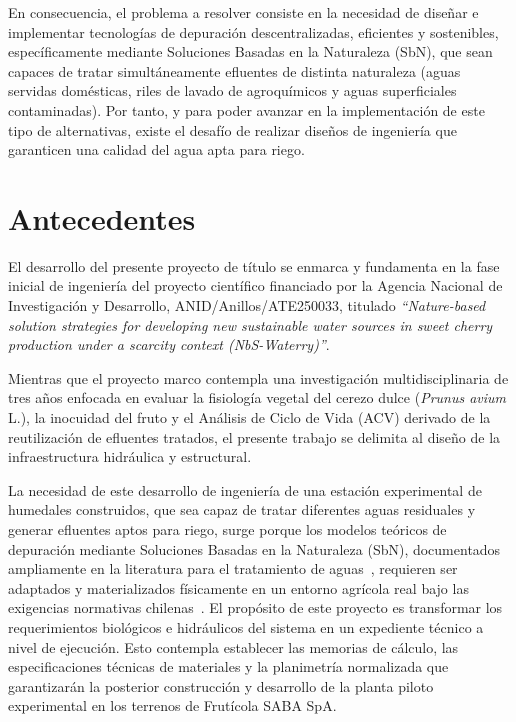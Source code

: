 En consecuencia, el problema a resolver consiste en la necesidad de diseñar e implementar tecnologías de depuración descentralizadas, eficientes y sostenibles, específicamente mediante Soluciones Basadas en la Naturaleza (SbN), que sean capaces de tratar simultáneamente efluentes de distinta naturaleza (aguas servidas domésticas, riles de lavado de agroquímicos y aguas superficiales contaminadas).
Por tanto, y para poder avanzar en la implementación de este tipo de alternativas, existe el desafío de realizar diseños de ingeniería que garanticen una calidad del agua apta para riego.

\section{Antecedentes}
\label{sec:antecedentes}

El desarrollo del presente proyecto de título se enmarca y fundamenta en la fase inicial de ingeniería del proyecto científico financiado por la Agencia Nacional de Investigación y Desarrollo, ANID/Anillos/ATE250033, titulado \textit{\enquote{Nature-based solution strategies for developing new sustainable water sources in sweet cherry production under a scarcity context (NbS-Waterry)}}.

Mientras que el proyecto marco contempla una investigación multidisciplinaria de tres años enfocada en evaluar la fisiología vegetal del cerezo dulce (\textit{Prunus avium} L.), la inocuidad del fruto y el Análisis de Ciclo de Vida (ACV) derivado de la reutilización de efluentes tratados, el presente trabajo se delimita al diseño de la infraestructura hidráulica y estructural.

La necesidad de este desarrollo de ingeniería de una estación experimental de humedales construidos, que sea capaz de tratar diferentes aguas residuales y generar efluentes aptos para riego, surge porque los modelos teóricos de depuración mediante Soluciones Basadas en la Naturaleza (SbN), documentados ampliamente en la literatura para el tratamiento de aguas~\parencite{dotro2021humedales}, requieren ser adaptados y materializados físicamente en un entorno agrícola real bajo las exigencias normativas chilenas~\parencite{inn1987nch1333}.
El propósito de este proyecto es transformar los requerimientos biológicos e hidráulicos del sistema en un expediente técnico a nivel de ejecución.
Esto contempla establecer las memorias de cálculo, las especificaciones técnicas de materiales y la planimetría normalizada que garantizarán la posterior construcción y desarrollo de la planta piloto experimental en los terrenos de Frutícola SABA SpA.

